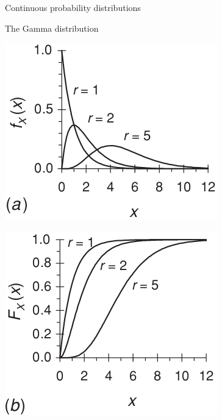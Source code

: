 \documentclass[8pt]{beamer}
\begin{document}
\begin{frame}{Continuous probability distributions}
\begin{block}{The \alert{Gamma} distribution}
    \end{block}
   \vspace{-9pt}
\begin{minipage}{0.49\textwidth}
\centering
\includegraphics[width=0.8\linewidth]{fi424a.png}  %
\end{minipage}
\hfill
\begin{minipage}{0.49\textwidth}
\centering
\includegraphics[width=0.8\linewidth]{fi424b.png} %
\end{minipage}
\end{frame}
\end{document}
